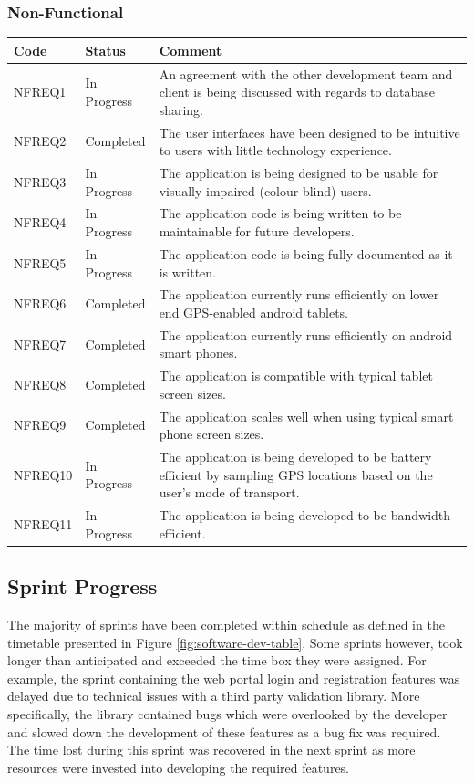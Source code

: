 \documentclass[11pt,a4paper]{article}
\begin{document}
\subsubsection{Non-Functional}
\label{sec:non-func-reqs}

\begin{longtable}{ p{}|p{}|p{} }
\textbf{Code} & \textbf{Status} & \textbf{Comment} \\

\hline
NFREQ1 & In Progress & An agreement with the other development team and client is being discussed with regards to database sharing. \\ \hline
NFREQ2 & Completed & The user interfaces have been designed to be intuitive to users with little technology experience. \\ \hline
NFREQ3 & In Progress & The application is being designed to be usable for visually impaired (colour blind) users. \\ \hline
NFREQ4 & In Progress & The application code is being written to be maintainable for future developers. \\ \hline
NFREQ5 & In Progress & The application code is being fully documented as it is written. \\ \hline
NFREQ6 & Completed & The application currently runs efficiently on lower end GPS-enabled android tablets. \\ \hline
NFREQ7 & Completed & The application currently runs efficiently on android smart phones. \\ \hline
NFREQ8 & Completed & The application is compatible with typical tablet screen sizes. \\ \hline
NFREQ9 & Completed & The application scales well when using typical smart phone screen sizes. \\ \hline
NFREQ10 & In Progress & The application is being developed to be battery efficient by sampling GPS locations based on the user's mode of transport. \\ \hline
NFREQ11 & In Progress & The application is being developed to be bandwidth efficient. \\ \hline
\end{longtable}

\subsection{Sprint Progress}
The majority of sprints have been completed within schedule as defined in the timetable presented in Figure \ref{fig:software-dev-table}. Some sprints however, took longer than anticipated and exceeded the time box they were assigned. For example, the sprint containing the web portal login and registration features was delayed due to technical issues with a third party validation library. More specifically, the library contained bugs which were overlooked by the developer and slowed down the development of these features as a bug fix was required. The time lost during this sprint was recovered in the next sprint as more resources were invested into developing the required features.
\end{document}
